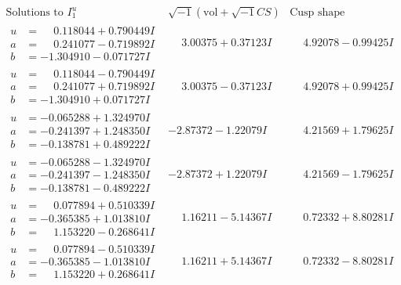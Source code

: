 \documentclass[1p]{elsarticle_modified}
\theoremstyle{definition}
\newcommand{\I}{\sqrt{-1}}
\begin{document}
$$\begin{array}{c|c|c}  
\text{Solutions to }I^u_{1}& \I (\text{vol} + \sqrt{-1}CS) & \text{Cusp shape}\\
 \hline 
\begin{aligned}
u &= \phantom{-}0.118044 + 0.790449 I \\
a &= \phantom{-}0.241077 - 0.719892 I \\
b &= -1.304910 - 0.071727 I\end{aligned}
 & \phantom{-}3.00375 + 0.37123 I & \phantom{-}4.92078 - 0.99425 I \\ \hline\begin{aligned}
u &= \phantom{-}0.118044 - 0.790449 I \\
a &= \phantom{-}0.241077 + 0.719892 I \\
b &= -1.304910 + 0.071727 I\end{aligned}
 & \phantom{-}3.00375 - 0.37123 I & \phantom{-}4.92078 + 0.99425 I \\ \hline\begin{aligned}
u &= -0.065288 + 1.324970 I \\
a &= -0.241397 + 1.248350 I \\
b &= -0.138781 + 0.489222 I\end{aligned}
 & -2.87372 - 1.22079 I & \phantom{-}4.21569 + 1.79625 I \\ \hline\begin{aligned}
u &= -0.065288 - 1.324970 I \\
a &= -0.241397 - 1.248350 I \\
b &= -0.138781 - 0.489222 I\end{aligned}
 & -2.87372 + 1.22079 I & \phantom{-}4.21569 - 1.79625 I \\ \hline\begin{aligned}
u &= \phantom{-}0.077894 + 0.510339 I \\
a &= -0.365385 + 1.013810 I \\
b &= \phantom{-}1.153220 - 0.268641 I\end{aligned}
 & \phantom{-}1.16211 - 5.14367 I & \phantom{-}0.72332 + 8.80281 I \\ \hline\begin{aligned}
u &= \phantom{-}0.077894 - 0.510339 I \\
a &= -0.365385 - 1.013810 I \\
b &= \phantom{-}1.153220 + 0.268641 I\end{aligned}
 & \phantom{-}1.16211 + 5.14367 I & \phantom{-}0.72332 - 8.80281 I \\ \hline\begin{aligned}

\end{aligned}
\end{array}$$
\end{document}
